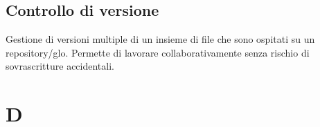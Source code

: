 \subsection*{Controllo di versione}
Gestione di versioni multiple di un insieme di file che sono ospitati su un repository/glo. Permette di lavorare collaborativamente senza rischio di sovrascritture accidentali.





\clearpage
\section*{D}

